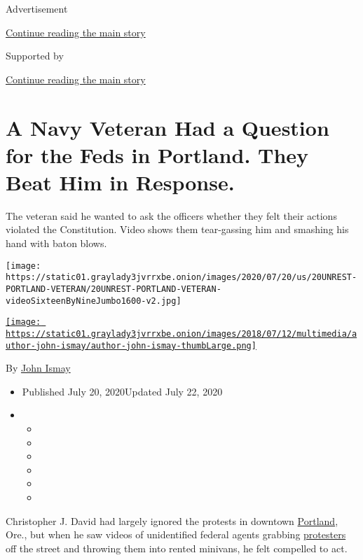 Advertisement

\protect\hyperlink{after-top}{Continue reading the main story}

Supported by

\protect\hyperlink{after-sponsor}{Continue reading the main story}

\hypertarget{a-navy-veteran-had-a-question-for-the-feds-in-portland-they-beat-him-in-response}{%
\section{A Navy Veteran Had a Question for the Feds in Portland. They
Beat Him in
Response.}\label{a-navy-veteran-had-a-question-for-the-feds-in-portland-they-beat-him-in-response}}

The veteran said he wanted to ask the officers whether they felt their
actions violated the Constitution. Video shows them tear-gassing him and
smashing his hand with baton blows.

\texttt{[image: https://static01.graylady3jvrrxbe.onion/images/2020/07/20/us/20UNREST-PORTLAND-VETERAN/20UNREST-PORTLAND-VETERAN-videoSixteenByNineJumbo1600-v2.jpg]}

\href{https://www.nytimes3xbfgragh.onion/by/john-ismay}{\texttt{[image: https://static01.graylady3jvrrxbe.onion/images/2018/07/12/multimedia/author-john-ismay/author-john-ismay-thumbLarge.png]}}

By \href{https://www.nytimes3xbfgragh.onion/by/john-ismay}{John Ismay}

\begin{itemize}
\item
  Published July 20, 2020Updated July 22, 2020
\item
  \begin{itemize}
  \item
  \item
  \item
  \item
  \item
  \item
  \end{itemize}
\end{itemize}

Christopher J. David had largely ignored the protests in downtown
\href{https://www.nytimes3xbfgragh.onion/2020/07/21/us/portland-protests.html}{Portland},
Ore., but when he saw videos of unidentified federal agents grabbing
\href{https://www.nytimes3xbfgragh.onion/2020/07/21/us/portland-protests.html}{protesters}
off the street and throwing them into rented minivans, he felt compelled
to act.


